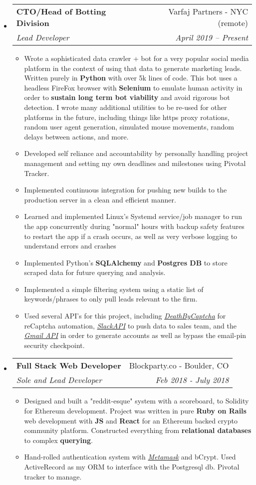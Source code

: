 \documentclass[letterpaper,11pt]{article}
\makeatletter
\newcommand{\resitem}[1]{\item #1 \vspace{-2pt}}
\newcommand{\ressubheading}[4]{
\begin{tabular*}{6.5in}{l@{\cftdotfill{\cftsecdotsep}\extracolsep{\fill}}r}
		\textbf{#1} & #2 \\
		\textit{#3} & \textit{#4} \\
\end{tabular*}\vspace{-6pt}}
\makeatother
\begin{document}
\begin{itemize}
\item 
	\ressubheading{CTO/Head of Botting Division}{Varfaj Partners - NYC (remote)}{Lead Developer}{April 2019 -- Present}
	\begin{itemize}
		\resitem{Wrote a sophisticated data crawler + bot for a very popular social media platform in the context of using that data to generate marketing leads. Written purely in \textbf{Python} with over 5k lines of code. This bot uses a headless FireFox browser with \textbf{Selenium} to emulate human activity in order to \textbf{sustain long term bot viability} and avoid rigorous bot detection. I wrote many additional utilities to be re-used for other platforms in the future, including things like https proxy rotations, random user agent generation, simulated mouse movements, random delays between actions, and more.}
		\resitem{Developed self reliance and accountability by personally handling project management and setting my own deadlines and milestones using Pivotal Tracker.}
		\resitem{Implemented continuous integration for pushing new builds to the production server in a clean and efficient manner.}
		\resitem{Learned and implemented Linux's Systemd service/job manager to run the app concurrently during "normal" hours with backup safety features to restart the app if a crash occurs, as well as very verbose logging to understand errors and crashes}
		\resitem{Implemented Python's \textbf{SQLAlchemy} and \textbf{Postgres DB} to store scraped data for future querying and analysis.}
		\resitem{Implemented a simple filtering system using a static list of keywords/phrases to only pull leads relevant to the firm.}
		\resitem{Used several API's for this project, including \href{https://www.deathbycaptcha.com/}{\textit{DeathByCaptcha}} for reCaptcha automation, \href{https://api.slack.com/}{\textit{SlackAPI}} to push data to sales team, and the \href{https://developers.google.com/gmail/api/}{\textit{Gmail API}} in order to generate accounts as well as bypass the email-pin security checkpoint.}
	\end{itemize}

\item 
	\ressubheading{Full Stack Web Developer}{Blockparty.co - Boulder, CO}{Sole and Lead Developer}{Feb 2018 - July 2018}
	\begin{itemize}
		\resitem{Designed and built a "reddit-esque" system with a scoreboard, to Solidity for Ethereum development. Project was written in pure \textbf{Ruby on Rails} web development with \textbf{JS} and \textbf{React} for an Ethereum backed crypto community platform. Constructed everything from \textbf{relational databases} to complex \textbf{querying}.}
		\resitem{Hand-rolled authentication system with \href{https://metamask.io/}{\textit{Metamask}} and bCrypt. Used ActiveRecord as my ORM to interface with the Postgresql db. Pivotal tracker to manage.}
	\end{itemize}


\end{itemize}
\end{document}
